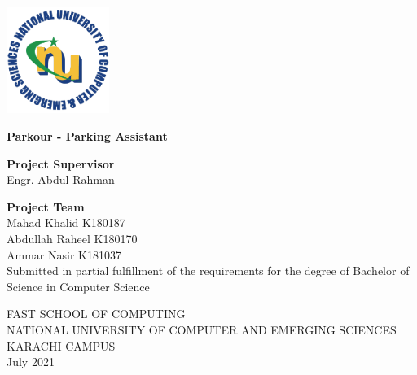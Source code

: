 \begin{titlepage}
    \begin{center}
        \vspace*{1cm}

        \includegraphics*[width=0.25\textwidth]{images/nu.png}


        \vspace{1cm}

        \Huge
        \textbf{Parkour - Parking Assistant}

        \vspace{1.0cm}
        \Large
        \textbf{Project Supervisor}\\
        \vspace{0.2cm}
        Engr. Abdul Rahman

        \vspace{1cm}
        \Large
        \textbf{Project Team}\\
        \vspace{0.2cm}
        \large
        Mahad Khalid K180187\\
        Abdullah Raheel K180170\\
        Ammar Nasir K181037\\
        \vspace{0.5cm}
        \small
        Submitted in partial fulfillment of the requirements for the degree of Bachelor of Science in
        Computer Science


        \vfill
        \normalsize
        FAST SCHOOL OF COMPUTING\\
        NATIONAL UNIVERSITY OF COMPUTER AND EMERGING SCIENCES\\
        KARACHI CAMPUS\\
        July 2021

    \end{center}
\end{titlepage}